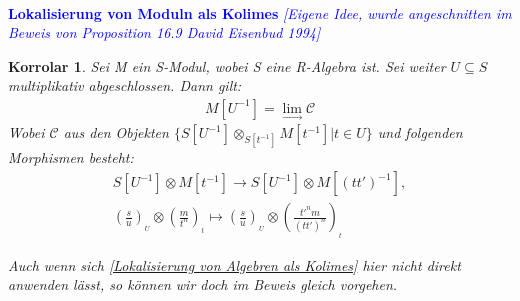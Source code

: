 \documentclass[10pt,a4paper]{report}
\newcommand{\comment}[1]{}
\newcommand{\ModulsOfDifferenzials}{David Eisenbud 1994}
\newcounter{Aussage}[chapter]
\newtheorem{korrolar}[Aussage]{Korrolar}
\newcommand{\Tensor}[3]{#1 \otimes_{#2} #3}
\newcommand{\tensor}[3]{#1 \otimes #3}
\newcommand{\lok}[2]{#1 [#2^{-1}]}
\newcommand{\loke}[3]{(\frac{#1}{#2})_{_{#3}}}
\newcommand{\colimes}[0]{\lim\limits_{ \longrightarrow }}
\begin{document}
\ \\
\textcolor{blue}{\textbf{Lokalisierung von Moduln als Kolimes} \textit{[Eigene Idee, wurde angeschnitten im Beweis von Proposition 16.9 \ModulsOfDifferenzials]}}
\begin{korrolar}\comment{\label{Lokalisierung von Moduln als Kolimes}}
Sei M ein S-Modul, wobei S eine R-Algebra ist. Sei weiter $U \subseteq S$ multiplikativ abgeschlossen. Dann gilt:
\begin{gather*}
\lok{M}{U} = \colimes \mathcal{C}
\end{gather*}
Wobei $\mathcal{C}$ aus den Objekten $\lbrace \Tensor{\lok{S}{U}}{\lok{S}{t}}{\lok{M}{t}} \vert t \in U \rbrace$ und folgenden Morphismen besteht:
\begin{gather*}
\tensor{\lok{S}{U}}{\lok{S}{t}}{\lok{M}{t}} \longrightarrow
\tensor{\lok{S}{U}}{\lok{S}{(tt')}}{\lok{M}{(tt')}} ,\\
\tensor{\loke{s}{u}{U}}{\lok{S}{t}}{\loke{m}{t^n}{t}} \longmapsto
\tensor{\loke{s}{u}{U}}{\lok{S}{t}}{\loke{t'^nm}{(tt')^n}{t}} 
\end{gather*}
\end{korrolar}
\textit{Auch wenn sich \cref{Lokalisierung von Algebren als Kolimes} hier nicht direkt anwenden lässt, so können wir doch im Beweis gleich vorgehen.}
\end{document}
